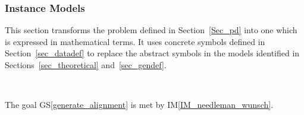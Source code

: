 \documentclass[12pt]{article}
\newcommand{\colAwidth}{0.13\textwidth}
\newcommand{\colBwidth}{0.82\textwidth}
\newcommand{\gsref}[1]{GS\ref{#1}}
\newcommand{\iref}[1]{IM\ref{#1}}
\begin{document}


\subsubsection{Instance Models} \label{sec_instance}    


This section transforms the problem defined in Section~\ref{Sec_pd} into 
one which is expressed in mathematical terms. It uses concrete symbols defined 
in Section~\ref{sec_datadef} to replace the abstract symbols in the models 
identified in Sections~\ref{sec_theoretical} and~\ref{sec_gendef}.




~\newline

The goal \gsref{generate_alignment} is met by \iref{IM_needleman_wunsch}. 
\end{document}
